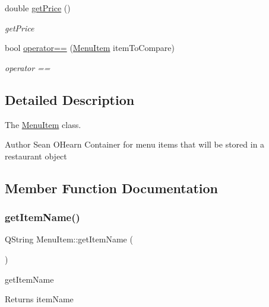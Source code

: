 \begin{DoxyCompactItemize}
double \hyperlink{class_menu_item_a5b9bbfe9c37ff669a5e3b21c171e28a0}{get\+Price} ()
\begin{DoxyCompactList}\small\item\em get\+Price \end{DoxyCompactList}\item 
bool \hyperlink{class_menu_item_a32972e702a424fc12cf96c561dbc5698}{operator==} (\hyperlink{class_menu_item}{Menu\+Item} item\+To\+Compare)
\begin{DoxyCompactList}\small\item\em operator == \end{DoxyCompactList}\end{DoxyCompactItemize}


\subsection{Detailed Description}
The \hyperlink{class_menu_item}{Menu\+Item} class. 

\begin{DoxyAuthor}{Author}
Sean O\textquotesingle{}Hearn Container for menu items that will be stored in a restaurant object 
\end{DoxyAuthor}


\subsection{Member Function Documentation}
\mbox{\label{class_menu_item_a4d6f0c0ce06292a95521c2f01c360393}} 
\subsubsection{\texorpdfstring{get\+Item\+Name()}{getItemName()}}
{\footnotesize\ttfamily Q\+String Menu\+Item\+::get\+Item\+Name (\begin{DoxyParamCaption}{ }\end{DoxyParamCaption})}



get\+Item\+Name 

\begin{DoxyReturn}{Returns}
item\+Name 
\end{DoxyReturn}
\mbox{\label{class_menu_item_a5b9bbfe9c37ff669a5e3b21c171e28a0}} 
